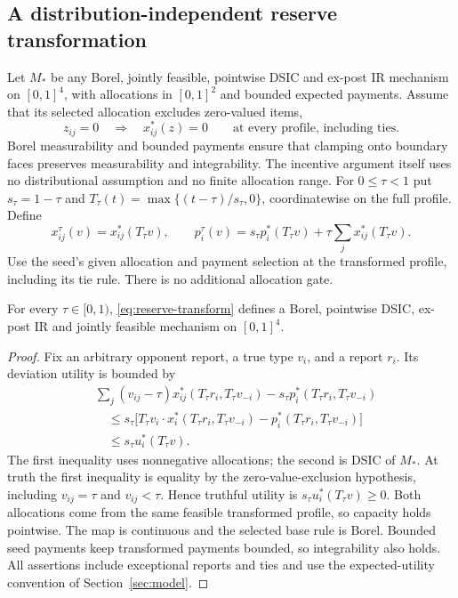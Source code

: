 \subsection{A distribution-independent reserve transformation}\label{sec:reserve-general}
Let $M_*$ be any Borel, jointly feasible, pointwise DSIC and ex-post IR
mechanism on $[0,1]^4$, with allocations in $[0,1]^2$ and bounded expected
payments. Assume that its selected allocation excludes zero-valued items,
\[
 z_{ij}=0\quad\Longrightarrow\quad x^*_{ij}(z)=0
 \qquad\text{at every profile, including ties}.
\]
Borel measurability and bounded payments ensure that clamping onto boundary
faces preserves measurability and integrability. The incentive argument
itself uses no distributional assumption and no finite allocation range.
For $0\le\tau<1$ put $s_\tau=1-\tau$ and
$T_\tau(t)=\max\{(t-\tau)/s_\tau,0\}$, coordinatewise on the full profile.
Define
\begin{equation}\label{eq:reserve-transform}
 x^\tau_{ij}(v)=x^*_{ij}(T_\tau v),\qquad
 p_i^\tau(v)=s_\tau p_i^*(T_\tau v)+\tau\sum_jx^*_{ij}(T_\tau v).
\end{equation}
Use the seed's given allocation and payment selection at the transformed
profile, including its tie rule. There is no additional allocation gate.

\begin{proposition}\label{prop:reserve-preservation}
For every $\tau\in[0,1)$, \eqref{eq:reserve-transform} defines a Borel,
pointwise DSIC, ex-post IR and jointly feasible mechanism on $[0,1]^4$.

\end{proposition}
\begin{proof}
Fix an arbitrary opponent report, a true type $v_i$, and a report $r_i$.
Its deviation utility is bounded by
\begin{align*}
 &\sum_j(v_{ij}-\tau)x^*_{ij}(T_\tau r_i,T_\tau v_{-i})
       -s_\tau p_i^*(T_\tau r_i,T_\tau v_{-i})\\
 &\quad\le s_\tau\big[T_\tau v_i\cdot x_i^*(T_\tau r_i,T_\tau v_{-i})
       -p_i^*(T_\tau r_i,T_\tau v_{-i})\big]\\
 &\quad\le s_\tau u_i^*(T_\tau v).
\end{align*}
The first inequality uses nonnegative allocations; the second is DSIC
of $M_*$. At truth the first inequality is equality by
the zero-value-exclusion hypothesis, including $v_{ij}=\tau$ and $v_{ij}<\tau$.
Hence truthful utility is $s_\tau u_i^*(T_\tau v)\ge0$.
Both allocations come from the same feasible transformed profile, so
capacity holds pointwise. The map is continuous and the selected base
rule is Borel. Bounded seed payments keep transformed payments bounded,
so integrability also holds. All assertions include exceptional reports and ties and
use the expected-utility convention of Section~\ref{sec:model}.
\end{proof}


